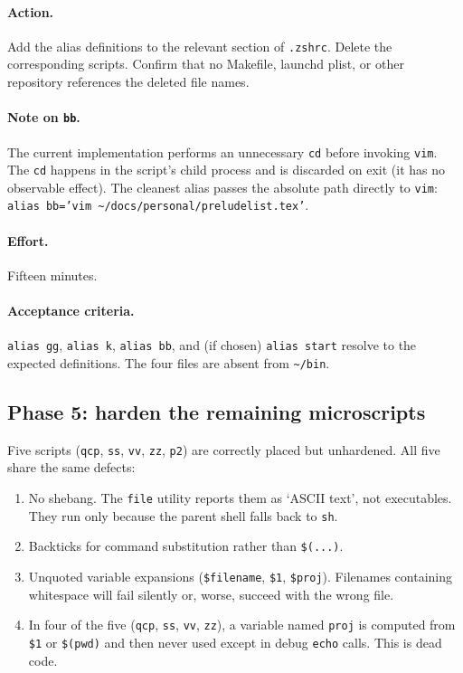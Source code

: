 \documentclass[11pt,letterpaper]{scrartcl}
\begin{document}
\paragraph{Action.} Add the alias definitions to the relevant
section of \texttt{.zshrc}. Delete the corresponding scripts.
Confirm that no Makefile, launchd plist, or other repository
references the deleted file names.

\paragraph{Note on \texttt{bb}.} The current implementation
performs an unnecessary \texttt{cd} before invoking \texttt{vim}.
The \texttt{cd} happens in the script's child process and is
discarded on exit (it has no observable effect). The cleanest
alias passes the absolute path directly to \texttt{vim}:
\texttt{alias bb='vim \textasciitilde/docs/personal/preludelist.tex'}.

\paragraph{Effort.} Fifteen minutes.

\paragraph{Acceptance criteria.} \texttt{alias gg}, \texttt{alias
k}, \texttt{alias bb}, and (if chosen) \texttt{alias start} resolve
to the expected definitions. The four files are absent from
\texttt{\textasciitilde/bin}.

\subsection{Phase 5: harden the remaining microscripts}

Five scripts (\texttt{qcp}, \texttt{ss}, \texttt{vv}, \texttt{zz},
\texttt{p2}) are correctly placed but unhardened. All five share
the same defects:

\begin{enumerate}
  \item No shebang. The \texttt{file} utility reports them as
        `ASCII text', not executables. They run only because the
        parent shell falls back to \texttt{sh}.
  \item Backticks for command substitution rather than
        \texttt{\$(...)}.
  \item Unquoted variable expansions (\texttt{\$filename},
        \texttt{\$1}, \texttt{\$proj}). Filenames containing
        whitespace will fail silently or, worse, succeed with the
        wrong file.
  \item In four of the five (\texttt{qcp}, \texttt{ss},
        \texttt{vv}, \texttt{zz}), a variable named \texttt{proj}
        is computed from \texttt{\$1} or \texttt{\$(pwd)} and then
        never used except in debug \texttt{echo} calls. This is
        dead code.
\end{enumerate}
\end{document}
